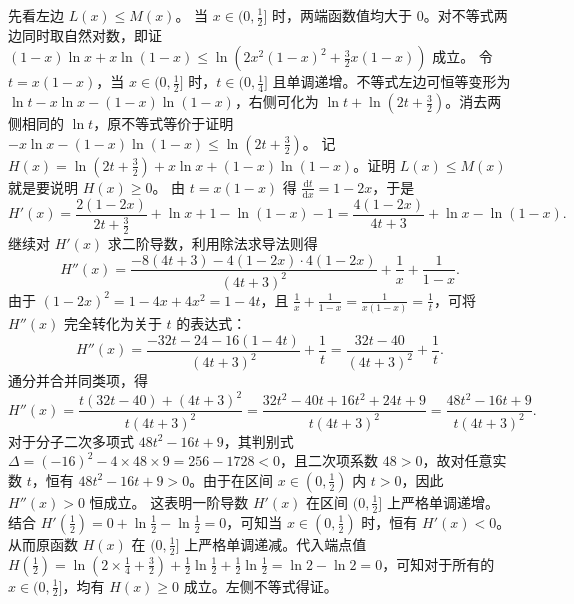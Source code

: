 \begin{solution}
先看左边 $L(x) \le M(x)$。
当 $x \in (0, \frac{1}{2}]$ 时，两端函数值均大于 $0$。对不等式两边同时取自然对数，即证 $(1-x)\ln x + x\ln(1-x) \le \ln\left(2x^2(1-x)^2 + \frac{3}{2}x(1-x)\right)$ 成立。
令 $t = x(1-x)$，当 $x \in (0, \frac{1}{2}]$ 时，$t \in (0, \frac{1}{4}]$ 且单调递增。不等式左边可恒等变形为 $\ln t - x\ln x - (1-x)\ln(1-x)$，右侧可化为 $\ln t + \ln\left(2t + \frac{3}{2}\right)$。消去两侧相同的 $\ln t$，原不等式等价于证明 $-x\ln x - (1-x)\ln(1-x) \le \ln\left(2t + \frac{3}{2}\right)$。
记 $H(x) = \ln\left(2t + \frac{3}{2}\right) + x\ln x + (1-x)\ln(1-x)$。证明 $L(x)\le M(x)$ 就是要说明 $H(x)\ge0$。
由 \(t=x(1-x)\) 得 $\frac{\mathrm{d}t}{\mathrm{d}x} = 1-2x$，于是
$$ H'(x) = \frac{2(1-2x)}{2t + \frac{3}{2}} + \ln x + 1 - \ln(1-x) - 1 = \frac{4(1-2x)}{4t + 3} + \ln x - \ln(1-x). $$
继续对 $H'(x)$ 求二阶导数，利用除法求导法则得
$$ H''(x) = \frac{-8(4t+3) - 4(1-2x) \cdot 4(1-2x)}{(4t+3)^2} + \frac{1}{x} + \frac{1}{1-x}. $$
由于 $(1-2x)^2 = 1 - 4x + 4x^2 = 1 - 4t$，且 $\frac{1}{x} + \frac{1}{1-x} = \frac{1}{x(1-x)} = \frac{1}{t}$，可将 $H''(x)$ 完全转化为关于 $t$ 的表达式：
$$ H''(x) = \frac{-32t - 24 - 16(1-4t)}{(4t+3)^2} + \frac{1}{t} = \frac{32t - 40}{(4t+3)^2} + \frac{1}{t}. $$
通分并合并同类项，得
$$ H''(x) = \frac{t(32t - 40) + (4t+3)^2}{t(4t+3)^2} = \frac{32t^2 - 40t + 16t^2 + 24t + 9}{t(4t+3)^2} = \frac{48t^2 - 16t + 9}{t(4t+3)^2}. $$
对于分子二次多项式 $48t^2 - 16t + 9$，其判别式 $\Delta = (-16)^2 - 4 \times 48 \times 9 = 256 - 1728 < 0$，且二次项系数 $48 > 0$，故对任意实数 $t$，恒有 $48t^2 - 16t + 9 > 0$。由于在区间 $x \in (0, \frac{1}{2})$ 内 $t > 0$，因此 $H''(x) > 0$ 恒成立。
这表明一阶导数 $H'(x)$ 在区间 $(0, \frac{1}{2}]$ 上严格单调递增。结合 $H'\left(\frac{1}{2}\right) = 0 + \ln\frac{1}{2} - \ln\frac{1}{2} = 0$，可知当 $x \in (0, \frac{1}{2})$ 时，恒有 $H'(x) < 0$。
从而原函数 $H(x)$ 在 $(0, \frac{1}{2}]$ 上严格单调递减。代入端点值 $H\left(\frac{1}{2}\right) = \ln\left(2 \times \frac{1}{4} + \frac{3}{2}\right) + \frac{1}{2}\ln\frac{1}{2} + \frac{1}{2}\ln\frac{1}{2} = \ln 2 - \ln 2 = 0$，可知对于所有的 $x \in (0, \frac{1}{2}]$，均有 $H(x) \ge 0$ 成立。左侧不等式得证。


\end{solution}

